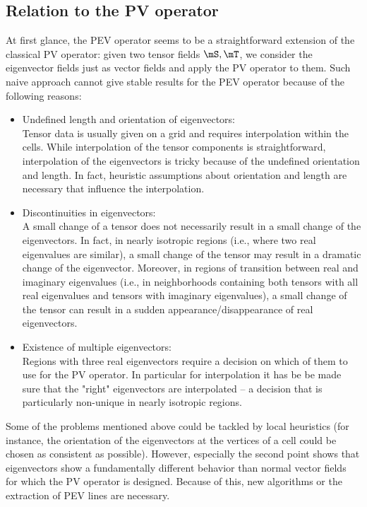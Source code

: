 \subsection*{Relation to the PV operator}
%
At first glance, the PEV operator seems to be a straightforward extension of the
classical PV operator:
%
given two tensor fields $\mS, \mT$, we consider the eigenvector fields just as
vector fields and apply the PV operator to them.
%
Such naive approach cannot give stable results for the PEV operator because of
the following reasons:
%
\begin{itemize}
    \item
    Undefined length and orientation of eigenvectors:\\
    Tensor data is usually given on a grid and requires interpolation within the
    cells.
    While interpolation of the tensor components is straightforward,
    interpolation of the eigenvectors is tricky because of the undefined
    orientation and length.
    In fact, heuristic assumptions about orientation and length are necessary
    that influence the interpolation.
    \item
    Discontinuities in eigenvectors:\\
    A small change of a tensor does not necessarily result in a small change of
    the eigenvectors.
    In fact, in nearly isotropic regions (i.e., where two real eigenvalues are
    similar), a small change of the tensor may result in a dramatic change of
    the eigenvector.
    Moreover, in regions of transition between real and imaginary eigenvalues
    (i.e., in neighborhoods containing both tensors with all real eigenvalues
    and tensors with imaginary eigenvalues), a small change of the tensor can
    result in a sudden appearance/disappearance of real eigenvectors.
    \item
    Existence of multiple eigenvectors:\\
    Regions with three real eigenvectors require a decision on which of them to
    use for the PV operator.
    In particular for interpolation it has be be made sure that the "right"
    eigenvectors are interpolated -- a decision that is particularly non-unique
    in nearly isotropic regions.
\end{itemize}
%
Some of the problems mentioned above could be tackled by local heuristics (for
instance, the orientation of the eigenvectors at the vertices of a cell could
be chosen as consistent as possible).
%
However, especially the second point shows that eigenvectors show a
fundamentally different behavior than normal vector fields for which the PV
operator is designed.
%
Because of this, new algorithms or the extraction of PEV lines are necessary.
%

